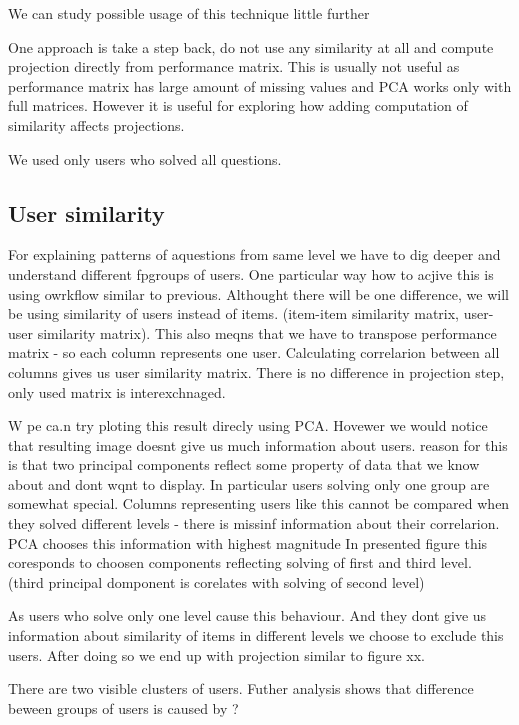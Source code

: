 \documentclass[
  digital, %
  table,   %
  nolof,     %
  nolot,     %
  nocover
]{fithesis3}
\begin{document}
We can study possible usage of this technique little further

One approach is take a step back, do not use any similarity at all and
compute projection directly from performance matrix. This is usually not
useful as performance matrix has large amount of missing values and PCA
works only with full matrices. However it is useful for exploring how
adding computation of similarity affects projections.

We used only users who solved all questions.

\subsection{User similarity}\label{user-similarity}


For explaining patterns of aquestions from same level we have to dig
deeper and understand different fpgroups of users. One particular way
how to acjive this is using owrkflow similar to previous. Althought
there will be one difference, we will be using similarity of users
instead of items. (item-item similarity matrix, user-user similarity
matrix). This also meqns that we have to transpose performance matrix -
so each column represents one user. Calculating correlarion between all
columns gives us user similarity matrix. There is no difference in
projection step, only used matrix is interexchnaged.

W pe ca.n try ploting this result direcly using PCA. Hovewer we would
notice that resulting image doesnt give us much information about users.
reason for this is that two principal components reflect some property
of data that we know about and dont wqnt to display. In particular users
solving only one group are somewhat special. Columns representing users
like this cannot be compared when they solved different levels - there
is missinf information about their correlarion. PCA chooses this
information with highest magnitude In presented figure this coresponds
to choosen components reflecting solving of first and third level.
(third principal domponent is corelates with solving of second level)

As users who solve only one level cause this behaviour. And they dont
give us information about similarity of items in different levels we
choose to exclude this users. After doing so we end up with projection
similar to figure xx.

There are two visible clusters of users. Futher analysis shows that
difference beween groups of users is caused by ?
\end{document}
